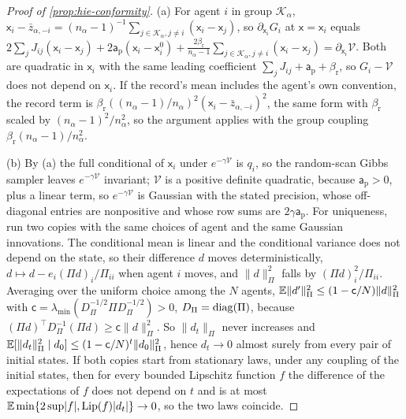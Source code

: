 \begin{proof}[Proof of \cref{prop:hie-conformity}]
(a) For agent $i$ in group $\mathcal K_\alpha$, $\mathsf x_i-\bar z_{\alpha,-i}=(n_\alpha-1)^{-1}\sum_{j\in\mathcal K_\alpha,j\neq i}(\mathsf x_i-\mathsf x_j)$, so $\partial_{\mathsf x_i}G_i$ at $\mathsf x=\mathsf x_i$ equals $2\sum_jJ_{ij}(\mathsf x_i-\mathsf x_j)+2\mathsf a_{\mathrm p}(\mathsf x_i-\mathsf x^0_i)+\frac{2\beta_{\mathrm r}}{n_\alpha-1}\sum_{j\in\mathcal K_\alpha,j\neq i}(\mathsf x_i-\mathsf x_j)=\partial_{\mathsf x_i}\mathcal V$. Both are quadratic in $\mathsf x_i$ with the same leading coefficient $\sum_jJ_{ij}+\mathsf a_{\mathrm p}+\beta_{\mathrm r}$, so $G_i-\mathcal V$ does not depend on $\mathsf x_i$. If the record's mean includes the agent's own convention, the record term is $\beta_{\mathrm r}((n_\alpha-1)/n_\alpha)^2(\mathsf x_i-\bar z_{\alpha,-i})^2$, the same form with $\beta_{\mathrm r}$ scaled by $(n_\alpha-1)^2/n_\alpha^2$, so the argument applies with the group coupling $\beta_{\mathrm r}(n_\alpha-1)/n_\alpha^2$.

(b) By (a) the full conditional of $\mathsf x_i$ under $e^{-\gamma\mathcal V}$ is $q_i$, so the random-scan Gibbs sampler leaves $e^{-\gamma\mathcal V}$ invariant; $\mathcal V$ is a positive definite quadratic, because $\mathsf a_{\mathrm p}>0$, plus a linear term, so $e^{-\gamma\mathcal V}$ is Gaussian with the stated precision, whose off-diagonal entries are nonpositive and whose row sums are $2\gamma\mathsf a_{\mathrm p}$. For uniqueness, run two copies with the same choices of agent and the same Gaussian innovations. The conditional mean is linear and the conditional variance does not depend on the state, so their difference $d$ moves deterministically, $d\mapsto d-e_i(\Pi d)_i/\Pi_{ii}$ when agent $i$ moves, and $\lVert d\rVert_\Pi^2$ falls by $(\Pi d)_i^2/\Pi_{ii}$. Averaging over the uniform choice among the $N$ agents, $\mathbb{E}\lVert d'\rVert_\Pi^2\le(1-\mathsf c/N)\lVert d\rVert_\Pi^2$ with $\mathsf c=\lambda_{\min}(D_\Pi^{-1/2}\Pi D_\Pi^{-1/2})>0$, $D_\Pi=\operatorname{diag}(\Pi)$, because $(\Pi d)^\top D_\Pi^{-1}(\Pi d)\ge\mathsf c\lVert d\rVert_\Pi^2$. So $\lVert d_t\rVert_\Pi$ never increases and $\mathbb{E}[\lVert d_t\rVert_\Pi^2\mid d_0]\le(1-\mathsf c/N)^t\lVert d_0\rVert_\Pi^2$, hence $d_t\to0$ almost surely from every pair of initial states. If both copies start from stationary laws, under any coupling of the initial states, then for every bounded Lipschitz function $f$ the difference of the expectations of $f$ does not depend on $t$ and is at most $\mathbb{E}\min\{2\sup\lvert f\rvert,\mathrm{Lip}(f)\lvert d_t\rvert\}\to0$, so the two laws coincide.


\end{proof}
